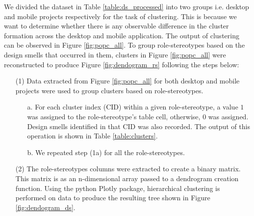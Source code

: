 \documentclass[AMA,Times1COL]{WileyNJDv5} %
\begin{document}
\begin{table}[b]
\begin{tabular*}{\textwidth}{@{\extracolsep\fill}llllllll@{}}
			\bottomrule
		\end{tabular*}
	\end{table}
	
	We divided the dataset in Table \ref{table:ds_processed} into two groups i.e. desktop and mobile projects respectively for the task of clustering. This is because we want to determine whether there is any observable difference in the cluster formation across the desktop and mobile application. The output of clustering can be observed in Figure \ref{fig:popc_all}. To group role-stereotypes based on the design smells that occurred in them, clusters  in Figure \ref{fig:popc_all} were reconstructed to produce Figure \ref{fig:dendogram_rs} following the steps below:
	\begin{enumerate}
		\item[(1)] Data extracted from Figure \ref{fig:popc_all} for both desktop and mobile projects were used to group clusters based on role-stereotypes.
		\begin{itemize}
			\item[a.] For each cluster index (CID) within a given role-stereotype, a value $1$ was assigned to the role-stereotype's table cell, otherwise, $0$ was assigned. Design smells identified in that CID was also recorded. The output of this operation is shown in Table \ref{table:clusters}.
			\item[b.] We repeated step (1a) for all the role-stereotypes.
		\end{itemize}
		\item[(2)] The role-stereotypes columns were extracted to create a binary matrix. This matrix is as an n-dimensional array passed to a dendrogram creation function\cite{ogenrwot}. Using the python Plotly package, hierarchical clustering is performed on data to produce the resulting tree shown in Figure \ref{fig:dendogram_ds}.
	\end{enumerate}
	
\end{document}
